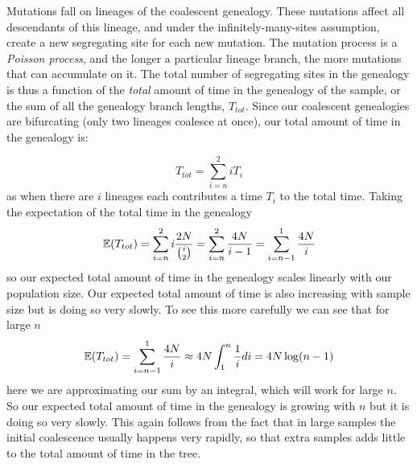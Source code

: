 Mutations fall on lineages of the coalescent genealogy. These mutations affect all
descendants of this lineage, and under the infinitely-many-sites assumption,
create a new segregating site for each new mutation. The mutation process is a
\emph{Poisson process}, and the longer a particular lineage branch, the more
mutations that can accumulate on it. The total number of segregating sites in
the genealogy is thus a function of the \emph{total} amount of time in the
genealogy of the sample, or the sum of all the genealogy branch lengths,
$T_{tot}$. Since our coalescent genealogies are bifurcating (only two lineages
coalesce at once), our total amount of time in the genealogy is:

\begin{equation}
T_{tot} = \sum_{i=n}^2 iT_i
\end{equation}
as when there are $i$ lineages each contributes a time $T_i$ to the
total time. Taking the expectation of the total time in the genealogy
\begin{equation}
\mathbb{E}(T_{tot}) = \sum_{i=n}^2 i \frac{2N}{{i \choose
 2} } = \sum_{i=n}^2 \frac{4N}{i -1} =\sum_{i=n-1}^1 \frac{4N}{i}
\end{equation}
so our expected total amount of time in the genealogy scales linearly
with our population size. Our expected total amount of time is also
increasing with sample size but is doing so very slowly. To see this
more carefully we can see that for large $n$
\begin{equation}
\mathbb{E}(T_{tot}) = \sum_{i=n-1}^1 \frac{4N}{i} \approx 4N \int_1^n \frac{1}{i} di
= 4N \log(n-1)
\end{equation}
here we are approximating our sum by an integral, which will work for
large $n$. So our expected total amount of time in the genealogy
is growing with $n$ but it is doing so very slowly. This again follows
from the fact that in large samples the initial coalescence usually
happens very rapidly, so that extra samples adds little to the total
amount of time in the tree. \\

